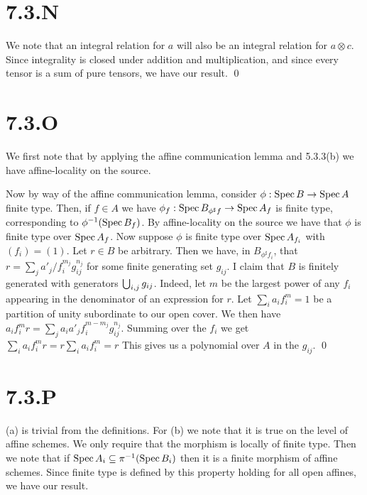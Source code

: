 \documentclass{article}
\begin{document}
\section{7.3.N}
We note that an integral relation for $a$ will also be an
integral relation for $a \otimes c$. Since integrality is closed
under addition and multiplication, and since every tensor is a sum of pure
tensors, we have our result. \qed

\section{7.3.O}
We first note that by applying the affine communication lemma and 5.3.3(b) we
have affine-locality on the source.

Now by way of the affine communication lemma, consider $\phi: \operatorname{Spec} B \to \operatorname{Spec}
    A$
finite type. Then, if $f \in A$ we have $\phi_f: \operatorname{Spec}
    B_{\phi^{\sharp}f}
    \to \operatorname{Spec} A_f$
is finite type, corresponding to $\phi^{-1}(\operatorname{Spec} B_f)$. By affine-locality on
the source we have that $\phi$ is finite type over
$\operatorname{Spec}
    A_f$. Now suppose $\phi$ is finite type
over $\operatorname{Spec} A_{f_i}$ with $(f_i)=(1)$. Let
$r \in B$ be arbitrary. Then we have, in $B_{\phi^{\sharp}f_i}$,
that $r=\sum_j a'_j/f_i^{m_j}g_{ij}^{n_j}$ for some finite generating set
$g_{ij}$. I claim that $B$ is finitely
generated with generators $\bigcup_{i,j} g_{ij}$. Indeed, let
$m$ be the largest power of any $f_i$
appearing in the denominator of an expression for $r$. Let
$\sum_i a_if_i^m = 1$ be a partition of unity subordinate to our open cover.
We then have $a_if_i^mr=\sum_j a_ia'_jf_i^{m-m_j}g_{ij}^{n_j}$. Summing over the $f_i$
we get $\sum_i
    a_if_i^mr=r\sum_ia_if_i^m=r$ This gives us a polynomial over
$A$ in the $g_{ij}$. \qed

\section{7.3.P}
 (a) is trivial from the definitions. For (b) we note that
it is true on the level of affine schemes. We only require that the morphism is
locally of finite type. Then we note that if $\operatorname{Spec} A_i \subseteq \pi^{-1}(\operatorname{Spec} B_i)$ then it is
a finite morphism of affine schemes. Since finite type is defined by this
property holding for all open affines, we have our result.
\end{document}

